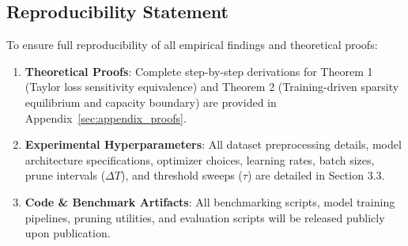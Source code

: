 \subsection*{Reproducibility Statement}

To ensure full reproducibility of all empirical findings and theoretical proofs:
\begin{enumerate}
    \item \textbf{Theoretical Proofs}: Complete step-by-step derivations for Theorem 1 (Taylor loss sensitivity equivalence) and Theorem 2 (Training-driven sparsity equilibrium and capacity boundary) are provided in Appendix~\ref{sec:appendix_proofs}.
    \item \textbf{Experimental Hyperparameters}: All dataset preprocessing details, model architecture specifications, optimizer choices, learning rates, batch sizes, prune intervals ($\Delta T$), and threshold sweeps ($\tau$) are detailed in Section 3.3.
    \item \textbf{Code \& Benchmark Artifacts}: All benchmarking scripts, model training pipelines, pruning utilities, and evaluation scripts will be released publicly upon publication.
\end{enumerate}
